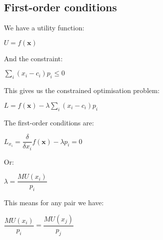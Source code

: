 
\subsection{First-order conditions}

We have a utility function:

\(U=f(\mathbf x)\)

And the constraint:

\(\sum_i (x_i-c_i)p_i\le 0\)

This gives us the constrained optimisation problem:

\(L=f(\mathbf x)-\lambda \sum_i (x_i-c_i)p_i\)

The first-order conditions are:

\(L_{x_i}=\dfrac{\delta }{\delta x_i}f(\mathbf x)-\lambda p_i=0\)

Or:

\(\lambda = \dfrac{MU(x_i)}{p_i}\)

This means for any pair we have:

\(\dfrac{MU(x_i)}{p_i}=\dfrac{MU(x_j)}{p_j}\)


